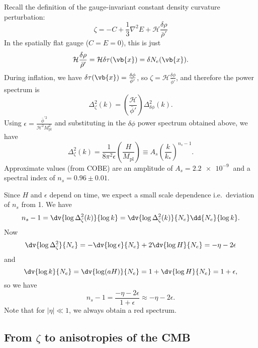 \documentclass{jknotes}
\begin{document}
Recall the definition of the gauge-invariant constant density curvature perturbation:
\begin{equation}
    \zeta = -C + \frac13\nabla^2E + \mathcal{H}\frac{\delta\rho}{\bar\rho'}
\end{equation}
In the spatially flat gauge (\(C=E=0\)), this is just 
\begin{equation}
    \mathcal{H}\frac{\delta\rho}{\bar\rho'} = \mathcal{H}\delta\tau(\vb{x}) = \delta N_e(\vb{x}).
\end{equation}
During inflation, we have \(\delta\tau(\vb{x}) = \frac{\delta\phi}{\bar\phi'}\), so \(\zeta = \mathcal{H}\frac{\delta\phi}{\bar\phi'}\), and therefore the power spectrum is
\begin{equation}
    \Delta^2_\zeta(k) = \left(\frac{\mathcal{H}}{\bar\phi'}\right)\Delta^2_{\delta\phi}(k).
\end{equation}
Using \(\epsilon = \frac{\bar\phi^{'2}}{\mathcal{H}^2M_{\text{pl}}^2}\) and substituting in the \(\delta\phi\) power spectrum obtained above, we have
\begin{equation}
    \Delta^2_{\zeta}(k) = \frac1{8\pi^2\epsilon}\left(\frac{H}{M_{\text{pl}}}\right) \equiv A_s\left(\frac{k}{k_*}\right)^{n_s-1}.
\end{equation}
Approximate values (from COBE) are an amplitude of \(A_s = \SI{2.2e-9}{}\) and a spectral index of \(n_s = 0.96\pm0.01\).

Since \(H\) and \(\epsilon\) depend on time, we expect a small scale dependence i.e.\ deviation of \(n_s\) from 1. We have
\begin{equation}
    n_s - 1 = \dv{\log\Delta^2_\zeta(k)}{\log k} = \dv{\log\Delta^2_\zeta(k)}{N_e} \dd{N_e}{\log k}.
\end{equation}
Now
\begin{equation}
    \dv{\log\Delta^2_\zeta}{N_e} = -\dv{\log\epsilon}{N_e} + 2\dv{\log H}{N_e} = -\eta - 2\epsilon
\end{equation}
and
\begin{equation}
    \dv{\log k}{N_e} = \dv{\log(aH)}{N_e} = 1 + \dv{\log H}{N_e} = 1 + \epsilon,
\end{equation}
so we have
\begin{equation}
    n_s - 1 = \frac{-\eta-2\epsilon}{1+\epsilon} \approx -\eta-2\epsilon.
\end{equation}
Note that for \(|\eta|\ll 1\), we always obtain a red spectrum.

\subsection{From \texorpdfstring{$\zeta$}{zeta} to anisotropies of the CMB}
\end{document}
